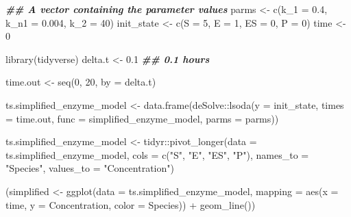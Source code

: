 \documentclass[
]{article}
\newenvironment{Shaded}{\begin{snugshade}}{\end{snugshade}}
\newcommand{\AttributeTok}[1]{\textcolor[rgb]{0.77,0.63,0.00}{#1}}
\newcommand{\DecValTok}[1]{\textcolor[rgb]{0.00,0.00,0.81}{#1}}
\newcommand{\DocumentationTok}[1]{\textcolor[rgb]{0.56,0.35,0.01}{\textbf{\textit{#1}}}}
\newcommand{\FloatTok}[1]{\textcolor[rgb]{0.00,0.00,0.81}{#1}}
\newcommand{\FunctionTok}[1]{\textcolor[rgb]{0.00,0.00,0.00}{#1}}
\newcommand{\NormalTok}[1]{#1}
\newcommand{\OtherTok}[1]{\textcolor[rgb]{0.56,0.35,0.01}{#1}}
\newcommand{\SpecialCharTok}[1]{\textcolor[rgb]{0.00,0.00,0.00}{#1}}
\newcommand{\StringTok}[1]{\textcolor[rgb]{0.31,0.60,0.02}{#1}}
\begin{document}
\begin{Shaded}
\begin{Highlighting}[]
\DocumentationTok{\#\# A vector containing the parameter values}
\NormalTok{parms }\OtherTok{\textless{}{-}} \FunctionTok{c}\NormalTok{(}\AttributeTok{k\_1 =} \FloatTok{0.4}\NormalTok{, }\AttributeTok{k\_n1 =} \FloatTok{0.004}\NormalTok{, }\AttributeTok{k\_2 =} \DecValTok{40}\NormalTok{)}
\NormalTok{init\_state }\OtherTok{\textless{}{-}} \FunctionTok{c}\NormalTok{(}\AttributeTok{S =} \DecValTok{5}\NormalTok{, }\AttributeTok{E =} \DecValTok{1}\NormalTok{, }\AttributeTok{ES =} \DecValTok{0}\NormalTok{, }\AttributeTok{P =} \DecValTok{0}\NormalTok{)}
\NormalTok{time }\OtherTok{\textless{}{-}} \DecValTok{0}

\FunctionTok{library}\NormalTok{(tidyverse)}
\NormalTok{delta.t }\OtherTok{\textless{}{-}} \FloatTok{0.1}  \DocumentationTok{\#\# 0.1 hours}

\NormalTok{time.out }\OtherTok{\textless{}{-}} \FunctionTok{seq}\NormalTok{(}\DecValTok{0}\NormalTok{, }\DecValTok{20}\NormalTok{, }\AttributeTok{by =}\NormalTok{ delta.t)}

\NormalTok{ts.simplified\_enzyme\_model }\OtherTok{\textless{}{-}} \FunctionTok{data.frame}\NormalTok{(deSolve}\SpecialCharTok{::}\FunctionTok{lsoda}\NormalTok{(}\AttributeTok{y =}\NormalTok{ init\_state, }
    \AttributeTok{times =}\NormalTok{ time.out, }\AttributeTok{func =}\NormalTok{ simplified\_enzyme\_model, }
    \AttributeTok{parms =}\NormalTok{ parms))}

\NormalTok{ts.simplified\_enzyme\_model }\OtherTok{\textless{}{-}}\NormalTok{ tidyr}\SpecialCharTok{::}\FunctionTok{pivot\_longer}\NormalTok{(}\AttributeTok{data =}\NormalTok{ ts.simplified\_enzyme\_model, }
    \AttributeTok{cols =} \FunctionTok{c}\NormalTok{(}\StringTok{"S"}\NormalTok{, }\StringTok{"E"}\NormalTok{, }\StringTok{"ES"}\NormalTok{, }\StringTok{"P"}\NormalTok{), }\AttributeTok{names\_to =} \StringTok{"Species"}\NormalTok{, }
    \AttributeTok{values\_to =} \StringTok{"Concentration"}\NormalTok{)}

\NormalTok{(simplified }\OtherTok{\textless{}{-}} \FunctionTok{ggplot}\NormalTok{(}\AttributeTok{data =}\NormalTok{ ts.simplified\_enzyme\_model, }
    \AttributeTok{mapping =} \FunctionTok{aes}\NormalTok{(}\AttributeTok{x =}\NormalTok{ time, }\AttributeTok{y =}\NormalTok{ Concentration, }\AttributeTok{color =}\NormalTok{ Species)) }\SpecialCharTok{+} 
    \FunctionTok{geom\_line}\NormalTok{())}
\end{Highlighting}
\end{Shaded}
\end{document}
